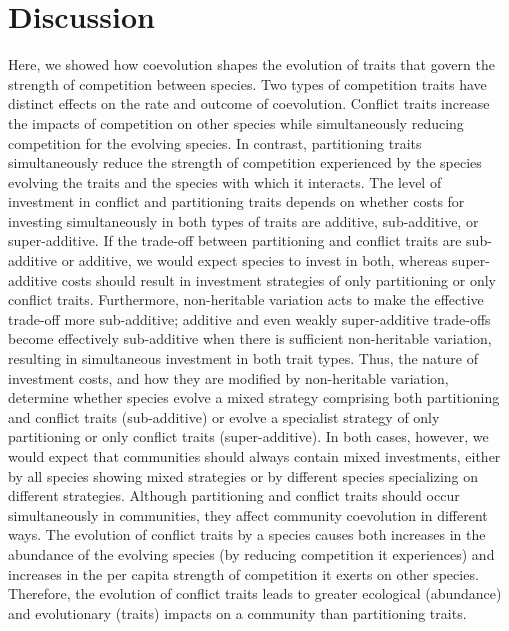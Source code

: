 
\section*{Discussion}


Here, we showed how coevolution shapes the evolution of traits that govern 
the strength of competition between species. Two types of competition traits
have distinct effects on the rate and outcome of coevolution. Conflict traits
increase the impacts of competition on other species while simultaneously
reducing competition for the evolving species. In contrast, partitioning 
traits simultaneously reduce the strength of competition experienced by the
species evolving the traits and the species with which it interacts. 
The level of investment in conflict and partitioning traits depends on 
whether costs for investing simultaneously in both types of traits are 
additive, sub-additive, or super-additive. If the trade-off between 
partitioning and conflict traits are sub-additive or additive, we would 
expect species to invest in both, whereas super-additive costs should 
result in investment strategies of only partitioning or only conflict traits.
Furthermore, non-heritable variation acts to make the effective trade-off 
more sub-additive; additive and even weakly super-additive trade-offs 
become effectively sub-additive when there is sufficient non-heritable
variation, resulting in simultaneous investment in both trait types. 
Thus, the nature of investment costs, and how they are modified by 
non-heritable variation, determine whether species evolve a mixed 
strategy comprising both partitioning and conflict traits (sub-additive) 
or evolve a specialist strategy of only partitioning or only conflict 
traits (super-additive). In both cases, however, we would expect that
communities should always contain mixed investments, either by all species
showing mixed strategies or by different species specializing on 
different strategies.
Although partitioning and conflict traits should occur simultaneously in
communities, they affect community coevolution in different ways. 
The evolution of conflict traits by a species causes both increases in 
the abundance of the evolving species (by reducing competition it 
experiences) and increases in the per capita strength of competition 
it exerts on other species. Therefore, the evolution of conflict traits 
leads to greater ecological (abundance) and evolutionary (traits) impacts 
on a community than partitioning traits.

